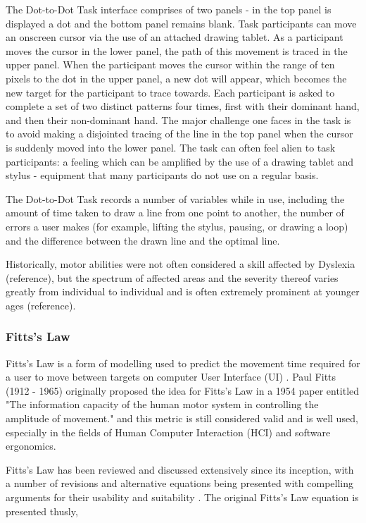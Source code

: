 			The Dot-to-Dot Task interface comprises of two panels - in the top panel is displayed a dot and the bottom panel remains blank. Task participants can move an onscreen cursor via the use of an attached drawing tablet. As a participant moves the cursor in the lower panel, the path of this movement is traced in the upper panel. When the participant moves the cursor within the range of ten pixels to the dot in the upper panel, a new dot will appear, which becomes the new target for the participant to trace towards. Each participant is asked to complete a set of two distinct patterns four times, first with their dominant hand, and then their non-dominant hand. The major challenge one faces in the task is to avoid making a disjointed tracing of the line in the top panel when the cursor is suddenly moved into the lower panel. The task can often feel alien to task participants: a feeling which can be amplified by the use of a drawing tablet and stylus - equipment that many participants do not use on a regular basis.
	
			The Dot-to-Dot Task records a number of variables while in use, including the amount of time taken to draw a line from one point to another, the number of errors a user makes (for example, lifting the stylus, pausing, or drawing a loop) and the difference between the drawn line and the optimal line.
	
			Historically, motor abilities were not often considered a skill affected by Dyslexia (reference), but the spectrum of affected areas and the severity thereof varies greatly from individual to individual and is often extremely prominent at younger ages (reference).
		
		\subsubsection{Fitts's Law}
			Fitts’s Law is a form of modelling used to predict the movement time required for a user to move between targets on computer User Interface (UI) \cite{MacKenzie1992, MacKenzie1995}. Paul Fitts (1912 - 1965) originally proposed the idea for Fitts’s Law in a 1954 paper entitled "The information capacity of the human motor system in controlling the amplitude of movement." \cite{Fitts1954} and this metric is still considered valid and is well used, especially in the fields of Human Computer Interaction (HCI) and software ergonomics.

			Fitts’s Law has been reviewed and discussed extensively since its inception, with a number of revisions and alternative equations being presented with compelling arguments for their usability and suitability \cite{MacKenzie1992, MacKenzie1995}. The original Fitts’s Law equation is presented thusly,


